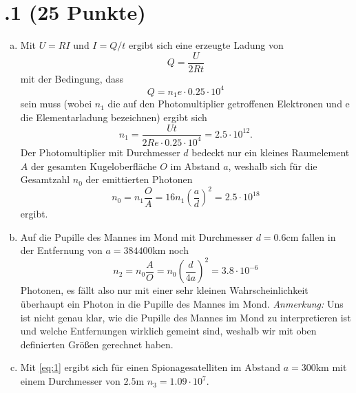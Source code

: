 \section*{\nr.1 \titone (25 Punkte)}
\begin{enumerate}[(a)]
\item Mit $U=RI$ und $I=Q/t$ ergibt sich eine erzeugte Ladung von 
\begin{equation}
  Q=\frac{U}{2Rt}
\end{equation}
mit der Bedingung, dass 
\begin{equation}
  Q=n_1e\cdot0.25\cdot10^4
\end{equation}
sein muss (wobei $n_1$ die auf den Photomultiplier getroffenen Elektronen und e die Elementarladung bezeichnen) ergibt sich
\begin{equation}
   n_1=\frac{Ut}{2Re\cdot 0.25\cdot10^4}=2.5\cdot10^{12}.
 \end{equation} 
Der Photomultiplier mit Durchmesser $d$ bedeckt nur ein kleines Raumelement $A$ der gesamten Kugeloberfläche $O$ im Abstand $a$, weshalb sich für die Gesamtzahl $n_0$ der emittierten Photonen
\begin{equation}
   n_0=n_1 \frac{O}{A}= 16 n_1 \left(\frac{a}{d}\right)^2=2.5\cdot10^{18}
 \end{equation} 
 ergibt.
 \item Auf die Pupille des Mannes im Mond mit Durchmesser $d=0.6$cm fallen in der Entfernung von $a=384400$km noch 
 \begin{equation}
   n_2=n_0 \frac{A}{O}=n_0 \left(\frac{d}{4a}\right)^2=3.8\cdot 10^{-6}
  \label{eq:1}
 \end{equation}
 Photonen, es fällt also nur mit einer sehr kleinen Wahrscheinlichkeit überhaupt ein Photon in die Pupille des Mannes im Mond. \emph{Anmerkung:} Uns ist nicht genau klar, wie die Pupille des Mannes im Mond zu interpretieren ist und welche Entfernungen wirklich gemeint sind, weshalb wir mit oben definierten Größen gerechnet haben.
 \item Mit \vref{eq:1} ergibt sich für einen Spionagesatelliten im Abstand $a=300$km mit einem Durchmesser von $2.5$m $n_3=1.09\cdot10^7$.

\end{enumerate}